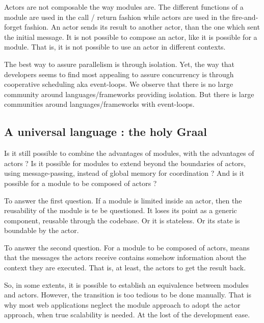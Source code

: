 Actors are not composable the way modules are.
The different functions of a module are used in the call / return fashion while actors are used in the fire-and-forget fashion.
An actor sends its result to another actor, than the one which sent the initial message.
It is not possible to compose an actor, like it is possible for a module.
That is, it is not possible to use an actor in different contexts.


The best way to assure parallelism is through isolation.
Yet, the way that developers seems to find most appealing to assure concurrency is through cooperative scheduling aka event-loops.
We observe that there is no large community around languages/frameworks providing isolation.
But there is large communities around languages/frameworks with event-loops.

\subsection{A universal language : the holy Graal}


Is it still possible to combine the advantages of modules, with the advantages of actors ?
Is it possible for modules to extend beyond the boundaries of actors, using message-passing, instead of global memory for coordination ?
And is it possible for a module to be composed of actors ?

To answer the first question.
If a module is limited inside an actor, then the reusability of the module is te be questioned.
It loses its point as a generic component, reusable through the codebase.
Or it is stateless.
Or its state is boundable by the actor.

To answer the second question.
For a module to be composed of actors, means that the messages the actors receive contains somehow information about the context they are executed.
That is, at least, the actors to get the result back.

So, in some extents, it is possible to establish an equivalence between modules and actors. However, the transition is too tedious to be done manually.
That is why most web applications neglect the module approach to adopt the actor approach, when true scalability is needed.
At the lost of the development ease.


